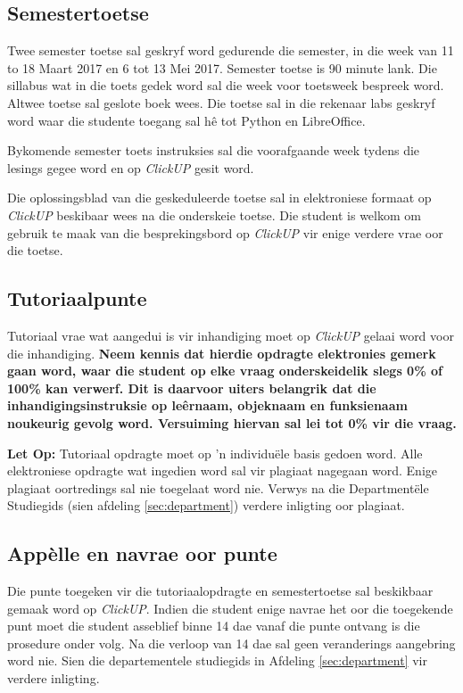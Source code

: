     \subsection{Semestertoetse}
        Twee semester toetse sal geskryf word gedurende die semester, in die
        week van 11 to 18 Maart 2017 en 6 tot 13 Mei 2017. Semester
        toetse is 90 minute lank. Die sillabus wat in die toets gedek word sal
        die week voor toetsweek bespreek word. Altwee toetse sal geslote boek
        wees. Die toetse sal in die rekenaar labs geskryf word waar die
        studente toegang sal h\^{e} tot Python en LibreOffice.

        Bykomende semester toets instruksies sal die voorafgaande week tydens
        die lesings gegee word en op \textit{ClickUP} gesit word.

        Die oplossingsblad van die geskeduleerde toetse sal in elektroniese
        formaat op \textit{ClickUP} beskibaar wees na die onderskeie toetse.
        Die student is welkom om gebruik te maak van die besprekingsbord op
        \textit{ClickUP} vir enige verdere vrae oor die toetse.

    \subsection{Tutoriaalpunte} \label{sec:tutoriaal}
        Tutoriaal vrae wat aangedui is vir inhandiging moet op \textit{ClickUP}
        gelaai word voor die inhandiging. \textbf{Neem kennis dat hierdie
        opdragte elektronies gemerk gaan word, waar die student op elke
        vraag onderskeidelik slegs 0\% of 100\% kan verwerf. Dit is
        daarvoor uiters belangrik dat die inhandigingsinstruksie op
        le\^ernaam, objeknaam en funksienaam noukeurig gevolg word.
        Versuiming hiervan sal lei tot 0\% vir die vraag.}

        \textbf{Let Op:} Tutoriaal opdragte moet op 'n individu\"ele basis
        gedoen word. Alle elektroniese opdragte wat ingedien word sal vir
        plagiaat nagegaan word. Enige plagiaat oortredings sal nie toegelaat
        word nie.  Verwys na die Department\"ele Studiegids (sien afdeling
        \ref{sec:department}) verdere inligting oor plagiaat.

    \subsection{App\`{e}lle en navrae oor punte}
        Die punte toegeken vir die tutoriaalopdragte en semestertoetse sal
        beskikbaar gemaak word op \textit{ClickUP}. Indien die student enige
        navrae het oor die toegekende punt moet die student asseblief binne 14
        dae vanaf die punte ontvang is die prosedure onder volg.  Na die
        verloop van 14 dae sal geen veranderings aangebring word nie. Sien die
        departementele studiegids in Afdeling \ref{sec:department} vir verdere
        inligting.

